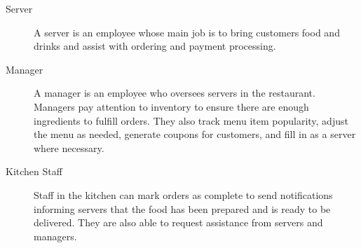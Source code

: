\documentclass[12pt]{article}
\begin{document}
\begin{description}
			\item[Server]				A server is an employee whose main job is to bring customers food and drinks and assist with ordering and payment processing.
			\item[Manager]				A manager is an employee who oversees servers in the restaurant. Managers pay attention to inventory to ensure there are enough ingredients to fulfill orders. They also track menu item popularity, adjust the menu as needed, generate coupons for customers, and fill in as a server where necessary.
			\item[Kitchen Staff]		Staff in the kitchen can mark orders as complete to send notifications informing servers that the food has been prepared and is ready to be delivered. They are also able to request assistance from servers and managers.
		\end{description}
\end{document}
